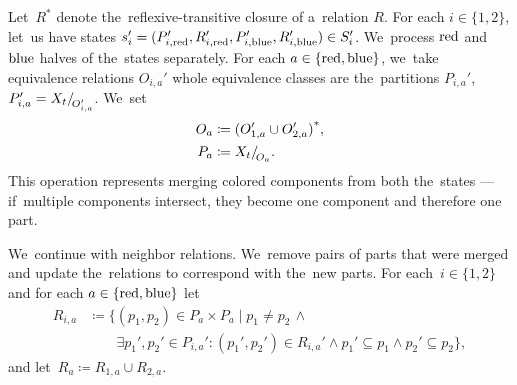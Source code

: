 Let~\( R^* \) denote the~reflexive-transitive closure of a~relation \( R \).
For each \( i \in \{1, 2\} \), let~us have states
\( s_i' = (P_{i,\text{red}}', R_{i,\text{red}}', P_{i,\text{blue}}', R_{i,\text{blue}}') \in S_i' \).
%
We~process \( \text{red} \) and \( \text{blue} \) halves of the~states separately.
For each \( a \in \{\text{red}, \text{blue}\} \),
we~take equivalence relations \( O_{i, a}' \)
whole equivalence classes are the~partitions \( P_{i, a}' \),
\( P_{i, a}' = X_t{/\!}_{O_{i, a}'}\).
We~set
%
\begin{equation}%
	\label{eq:fpt_reflexive_transitive_closure}
	\begin{aligned}
		O_a & \coloneqq {(O_{1, a}' \cup O_{2, a}')}^*, \\
		P_a & \coloneqq \equivclass{X_t}{O_a}.
	\end{aligned}
\end{equation}
%
This operation represents merging colored components from both the~states
--- if~multiple components intersect, they become one
component and therefore one part.

We~continue with neighbor relations. We~remove pairs of parts
that were merged and update the~relations to correspond with the~new parts.
For each~\( i \in \{1, 2\} \) and for each \( a \in \{\text{red}, \text{blue}\} \) let
%
\begin{align*}
	R_{i,a} & \coloneqq \{(p_1, p_2) \in P_a \times P_a \mid p_{1} \ne p_{2} \, \land                                                 \\
	        & \qquad \exists p_1', p_2' \in P_{i,a}' : (p_1', p_2') \in R_{i,a}' \land p_1' \subseteq p_1 \land p_2' \subseteq p_2\},
\end{align*}
%
and let~\( R_a \coloneqq R_{1,a} \cup R_{2,a} \).


